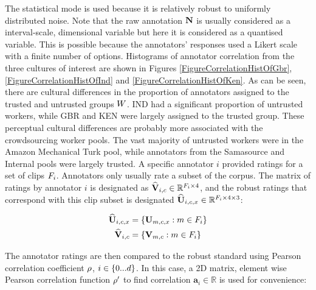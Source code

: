 The statistical mode is used because it is relatively robust to uniformly distributed noise. Note that the raw annotation $\textbf{N}$ is usually considered as a interval-scale, dimensional variable but here it is considered as a quantised variable. This is possible because the annotators' responses used a Likert scale with a finite number of options. Histograms of annotator correlation from the three cultures of interest are shown in Figures \ref{FigureCorrelationHistOfGbr}, \ref{FigureCorrelationHistOfInd} and \ref{FigureCorrelationHistOfKen}. As can be seen, there are cultural differences in the proportion of annotators assigned to the trusted and untrusted groups $W$. IND had a significant proportion of untrusted workers, while GBR and KEN were largely assigned to the trusted group. These perceptual cultural differences are probably more associated with the crowdsourcing worker pools. The vast majority of untrusted workers were in the Amazon Mechanical Turk pool, while annotators from the Samasource and Internal pools were largely trusted. A specific annotator $i$ provided ratings for a set of clips $F_i$. 
Annotators only usually rate a subset of the corpus. The matrix of ratings by annotator $i$ is designated as $\widehat{\textbf{V}}_{i,c} \in \mathbb{R}^{F_i \times 4}$, and the robust ratings that correspond with this clip subset is designated $\widehat{\textbf{U}}_{i,c,x} \in \mathbb{R}^{F_i \times 4 \times 3}$:

\begin{gather}
\widehat{\textbf{U}}_{i,c,x} = \{\textbf{U}_{m,c,x}: m \in F_{i}\} \\
\widehat{\textbf{V}}_{i,c} = \{ \textbf{V}_{m, c}: m \in F_{i}\}
\end{gather}

The annotator ratings are then compared to the robust standard using Pearson correlation coefficient $\rho$, $i \in \{0...d\}$. In this case, a 2{D} matrix, element wise Pearson correlation function $\rho'$ to find correlation $\textbf{a}_i \in \mathbb{R}$ is used for convenience:

